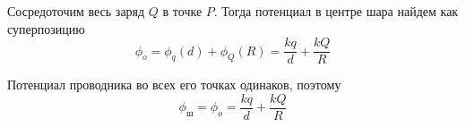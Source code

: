 \documentclass[a4paper,14pt]{extarticle}
\begin{document}
\begin{figure}[H]
    \centering
\end{figure}

Сосредоточим весь заряд $Q$ в точке $P$. Тогда потенциал в центре шара найдем как суперпозицию
\begin{equation}
    \phi_o=\phi_q(d)+\phi_Q(R)=\frac{kq}{d}+\frac{kQ}{R}
\end{equation}

Потенциал проводника во всех его точках одинаков, поэтому
\begin{equation}
    \phi_\text{ш}=\phi_o=\frac{kq}{d}+\frac{kQ}{R}
\end{equation}
\end{document}
